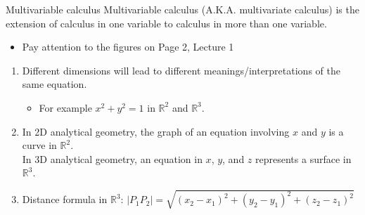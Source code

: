 \documentclass{beamer}
\begin{document}
\begin{frame}[allowframebreaks]{Multivariable calculus}
	Multivariable calculus (A.K.A. multivariate calculus) is the extension of calculus
	in one variable to calculus in more than one variable.
\begin{itemize}
	\item Pay attention to the figures on Page 2, Lecture 1
\end{itemize}
\begin{enumerate}
	\item Different \alert{dimensions} will lead to different meanings/interpretations of the \alert{same} equation.
	\begin{itemize}
		\item For example $x^2 + y^2 = 1$ in $\mathbb{R}^2$ and $\mathbb{R}^3$.
	\end{itemize}
	
	\item In 2D analytical geometry, the graph of an equation involving $x$ and $y$ is a \alert{curve} in $\mathbb{R}^2$. \\In 3D analytical geometry, an equation in $x$, $y$, and $z$ represents a \alert{surface} in $\mathbb{R}^3$.
	
	\item Distance formula in $\mathbb{R}^3$: $|P_1P_2| = \sqrt{(x_2 - x_1)^2 + (y_2 - y_1)^2 + (z_2-z_1)^2}$
\end{enumerate}


\end{frame}
\end{document}
